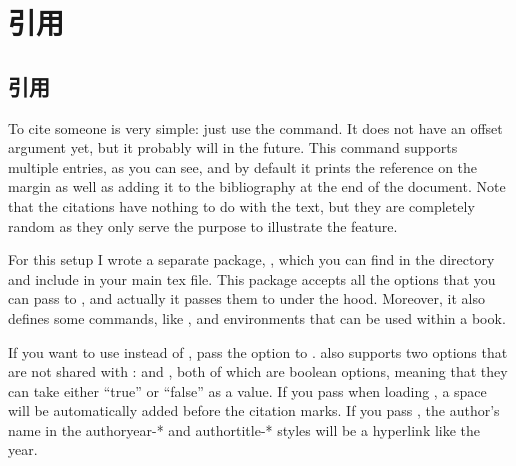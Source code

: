 \setchapterpreamble[u]{\margintoc}
\chapter{引用}

\section{引用}

To cite someone  is very simple: just
use the  command. It does
not have an offset argument yet, but it probably will in the future.
This command supports multiple entries, as you can see, and by default
it prints the reference on the margin as well as adding it to the
bibliography at the end of the document. Note that the citations have
nothing to do with the text, but they are completely
random as they only serve the purpose to illustrate the feature.

For this setup I wrote a separate package, , which
you can find in the  directory and include in your main
tex file. This package accepts all the options that you can pass to
, and actually it passes them to 
under the hood. Moreover, it also defines some commands, like
, and environments that can be used within a
 book.

If you want to use  instead of ,
pass the option  to .
 also supports two options that are not shared with
:  and ,
both of which are boolean options, meaning that they can take
either \enquote{true} or \enquote{false} as a value. If you
pass  when loading ,
a space will be automatically added before the citation marks.
If you pass , the author's name in
the authoryear-* and authortitle-* styles will be a hyperlink
like the year.

